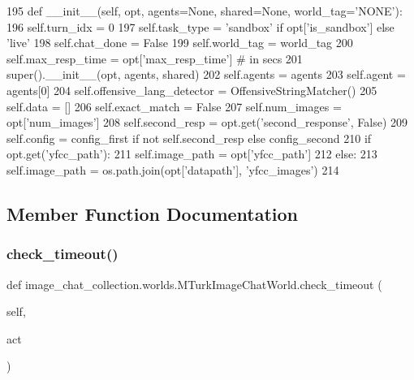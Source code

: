 \begin{DoxyCode}
195     \textcolor{keyword}{def }\_\_init\_\_(self, opt, agents=None, shared=None, world\_tag='NONE'):
196         self.turn\_idx = 0
197         self.task\_type = \textcolor{stringliteral}{'sandbox'} \textcolor{keywordflow}{if} opt[\textcolor{stringliteral}{'is\_sandbox'}] \textcolor{keywordflow}{else} \textcolor{stringliteral}{'live'}
198         self.chat\_done = \textcolor{keyword}{False}
199         self.world\_tag = world\_tag
200         self.max\_resp\_time = opt[\textcolor{stringliteral}{'max\_resp\_time'}]  \textcolor{comment}{# in secs}
201         super().\_\_init\_\_(opt, agents, shared)
202         self.agents = agents
203         self.agent = agents[0]
204         self.offensive\_lang\_detector = OffensiveStringMatcher()
205         self.data = []
206         self.exact\_match = \textcolor{keyword}{False}
207         self.num\_images = opt[\textcolor{stringliteral}{'num\_images'}]
208         self.second\_resp = opt.get(\textcolor{stringliteral}{'second\_response'}, \textcolor{keyword}{False})
209         self.config = config\_first \textcolor{keywordflow}{if} \textcolor{keywordflow}{not} self.second\_resp \textcolor{keywordflow}{else} config\_second
210         \textcolor{keywordflow}{if} opt.get(\textcolor{stringliteral}{'yfcc\_path'}):
211             self.image\_path = opt[\textcolor{stringliteral}{'yfcc\_path'}]
212         \textcolor{keywordflow}{else}:
213             self.image\_path = os.path.join(opt[\textcolor{stringliteral}{'datapath'}], \textcolor{stringliteral}{'yfcc\_images'})
214 
\end{DoxyCode}


\subsection{Member Function Documentation}
\mbox{\label{classimage__chat__collection_1_1worlds_1_1MTurkImageChatWorld_a333c8d7353ed7fba417461177035c209}} 
\subsubsection{\texorpdfstring{check\+\_\+timeout()}{check\_timeout()}}
{\footnotesize\ttfamily def image\+\_\+chat\+\_\+collection.\+worlds.\+M\+Turk\+Image\+Chat\+World.\+check\+\_\+timeout (\begin{DoxyParamCaption}\item[{}]{self,  }\item[{}]{act }\end{DoxyParamCaption})}



